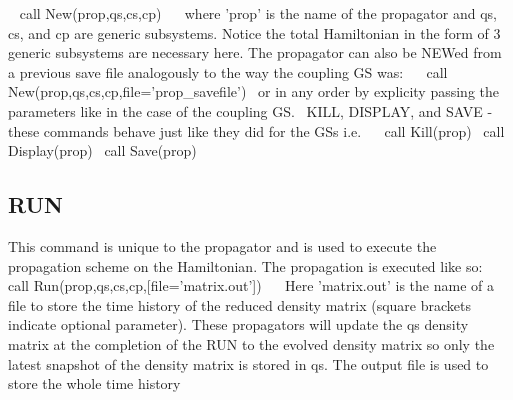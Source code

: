 ~\newline
 call New(prop,qs,cs,cp)~\newline
~\newline
where 'prop' is the name of the propagator and qs, cs, and cp are generic subsystems. Notice the total Hamiltonian in the form of 3 generic subsystems are necessary here. The propagator can also be N\+E\+Wed from a previous save file analogously to the way the coupling G\+S was\+:~\newline
~\newline
 call New(prop,qs,cs,cp,file='prop\+\_\+savefile')~\newline
or in any order by explicity passing the parameters like in the case of the coupling G\+S.~\newline
K\+I\+L\+L, D\+I\+S\+P\+L\+A\+Y, and S\+A\+V\+E -\/ these commands behave just like they did for the G\+Ss i.\+e.~\newline
~\newline
 call Kill(prop)~\newline
 call Display(prop)~\newline
 call Save(prop)~\newline
~\newline
\hypertarget{_interface_RUN}{}\subsection{R\+U\+N}\label{_interface_RUN}
This command is unique to the propagator and is used to execute the propagation scheme on the Hamiltonian. The propagation is executed like so\+:~\newline
~\newline
 call Run(prop,qs,cs,cp,\mbox{[}file='matrix.\+out'\mbox{]})~\newline
~\newline
Here 'matrix.\+out' is the name of a file to store the time history of the reduced density matrix (square brackets indicate optional parameter). These propagators will update the qs density matrix at the completion of the R\+U\+N to the evolved density matrix so only the latest snapshot of the density matrix is stored in qs. The output file is used to store the whole time history~\newline
~\newline

